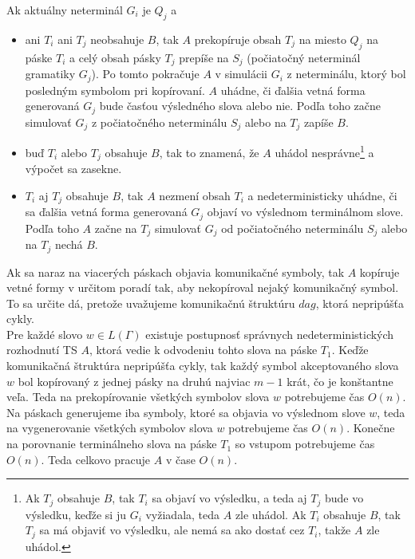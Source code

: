 \begin{dokaz}
  Ak aktuálny neterminál $G_i$ je $Q_j$ a
  \begin{itemize}
    \item ani $T_i$ ani $T_j$ neobsahuje $B$, tak $A$ prekopíruje obsah
    $T_j$ na miesto $Q_j$ na páske $T_i$ a celý obsah pásky $T_j$
    prepíše na $S_j$ (počiatočný neterminál gramatiky $G_j$). Po tomto
    pokračuje $A$ v simulácii $G_i$ z neterminálu, ktorý bol posledným
    symbolom pri kopírovaní. $A$ uhádne, či ďalšia vetná forma
    generovaná $G_j$ bude časťou výsledného slova alebo nie. Podľa
    toho začne simulovať $G_j$ z počiatočného neterminálu $S_j$ alebo
    na $T_j$ zapíše $B$.
    \item buď $T_i$ alebo $T_j$
    obsahuje $B$, tak to znamená, že $A$ uhádol nesprávne\footnote{Ak
    $T_j$ obsahuje $B$, tak $T_i$ sa objaví vo výsledku, a teda aj
    $T_j$ bude vo výsledku, keďže si ju $G_i$ vyžiadala, teda $A$ zle
    uhádol. Ak $T_i$ obsahuje $B$, tak $T_j$ sa má objaviť vo
    výsledku, ale nemá sa ako dostať cez $T_i$, takže $A$ zle uhádol.} a
    výpočet sa zasekne.
    \item $T_i$ aj $T_j$ obsahuje $B$, tak $A$ nezmení obsah $T_i$ a
    nedeterministicky uhádne, či sa ďalšia vetná forma generovaná
    $G_j$ objaví vo výslednom terminálnom slove. Podľa toho $A$ začne na
    $T_j$ simulovať $G_j$ od počiatočného neterminálu $S_j$ alebo na
    $T_j$ nechá $B$.
  \end{itemize}
  Ak sa naraz na viacerých páskach objavia komunikačné symboly, tak
  $A$ kopíruje vetné formy v určitom poradí tak, aby nekopíroval
  nejaký komunikačný symbol. To sa určite dá, pretože uvažujeme
  komunikačnú štruktúru $dag$, ktorá nepripúšťa cykly. \\ Pre každé
  slovo $w\in L(\Gamma)$ existuje postupnosť správnych
  nedeterministických rozhodnutí TS $A$, ktorá vedie k odvodeniu
  tohto slova na páske $T_1$. Keďže komunikačná štruktúra nepripúšťa
  cykly, tak každý symbol akceptovaného slova $w$ bol kopírovaný z
  jednej pásky na druhú najviac $m-1$ krát, čo je konštantne veľa.
  Teda na prekopírovanie všetkých symbolov slova $w$ potrebujeme čas
  $O(n)$. Na páskach generujeme iba symboly, ktoré sa objavia vo
  výslednom slove $w$, teda na vygenerovanie všetkých symbolov slova
  $w$ potrebujeme čas $O(n)$. Konečne na porovnanie terminálneho
  slova na páske $T_1$ so vstupom potrebujeme čas $O(n)$. Teda
  celkovo pracuje $A$ v čase $O(n)$.
\end{dokaz}

\medskip

